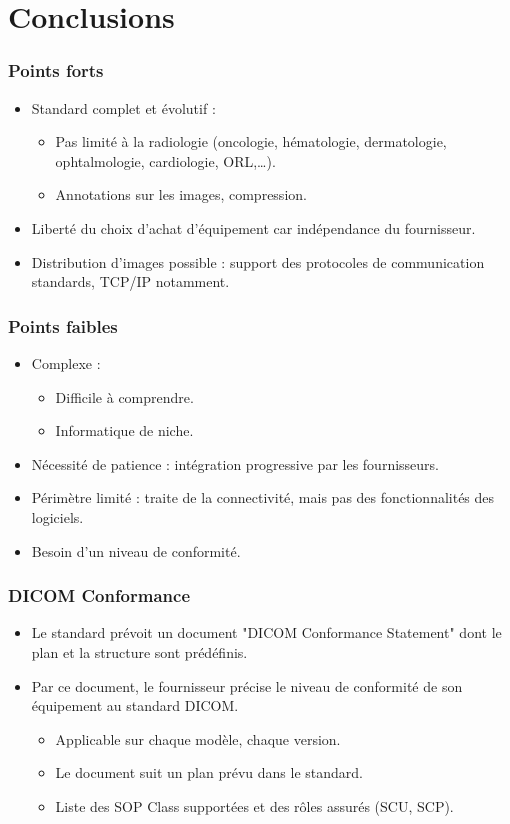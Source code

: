 \section{Conclusions}

\frame
{
	\frametitle{Points forts}
	\begin{itemize}
		\item Standard complet et \'evolutif :
		\begin{itemize}
			\item<2-> Pas limit\'e \`a la radiologie (oncologie, h\'ematologie, dermatologie, ophtalmologie, cardiologie, ORL,\ldots).
			\item<3-> Annotations sur les images, compression.
		\end{itemize}
		\item<4-> Libert\'e du choix d'achat d'\'equipement car ind\'ependance du fournisseur.
		\item<5-> Distribution d'images possible : support des protocoles de communication standards, TCP/IP notamment.
	\end{itemize}
}

\frame
{
	\frametitle{Points faibles}
	\begin{itemize}
		\item Complexe :
		\begin{itemize}
			\item<2-> Difficile \`a comprendre.
			\item<3-> Informatique de niche.
		\end{itemize}
		\item<4-> N\'ecessit\'e de patience : int\'egration progressive par les fournisseurs.
		\item<5-> P\'erim\`etre limit\'e : traite de la connectivit\'e, mais pas des fonctionnalit\'es des logiciels.
		\item<6-> Besoin d'un niveau de conformit\'e.
	\end{itemize}
}

\frame
{
	\frametitle{DICOM Conformance}
	\begin{itemize}
		\item Le standard pr\'evoit un document "DICOM Conformance Statement" dont le plan et la structure sont pr\'ed\'efinis.
		\item<2-> Par ce document, le fournisseur pr\'ecise le niveau de conformit\'e de son \'equipement au standard DICOM.
		\begin{itemize}
			\item<3-> Applicable sur chaque mod\`ele, chaque version.
			\item<4-> Le document suit un plan pr\'evu dans le standard.
			\item<5-> Liste des SOP Class support\'ees et des r\^oles assur\'es (SCU, SCP).
		\end{itemize}
	\end{itemize}
}

